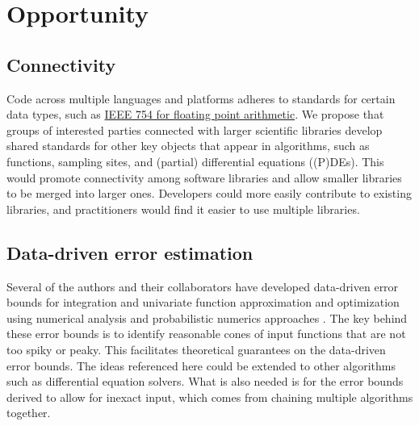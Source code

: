 \documentclass{amsart}
\begin{document}
   







\section{Opportunity} %
\subsection{Connectivity} 
Code across multiple languages and platforms adheres to standards for certain data types, such as \href{https://en.wikipedia.org/wiki/IEEE_754}{IEEE 754 for floating point arithmetic}.  We propose that groups of interested parties connected with larger scientific libraries develop shared standards for other key objects that appear in algorithms, such as functions, sampling sites, and (partial) differential equations ((P)DEs). This would promote connectivity among software libraries and allow smaller libraries to be merged into larger ones.  Developers could more easily contribute to existing libraries, and practitioners would find it easier to use multiple libraries.

\subsection{Data-driven error estimation} 
Several of the authors and their collaborators have developed data-driven error bounds for integration and univariate function approximation and optimization using numerical analysis and probabilistic numerics approaches \cite{ChoEtal17a, HicEtal14b, HicEtal14a, HicJim16a, RatHic19a,JimHic16a}.  The key behind these error bounds is to identify reasonable cones of input functions that are not too spiky or peaky.  This facilitates theoretical guarantees on the data-driven error bounds.  The ideas referenced here could be extended to other algorithms such as differential equation solvers.  What is also needed is for the error bounds derived to allow for inexact input, which comes from chaining multiple algorithms together.
\end{document}
